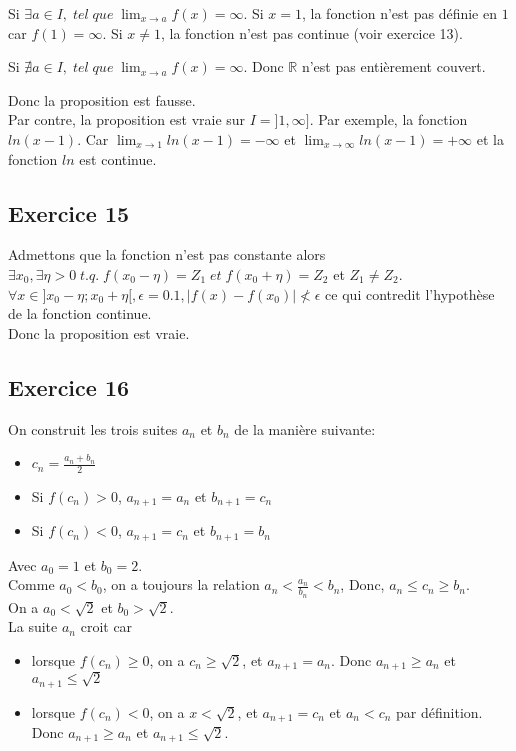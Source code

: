 \documentclass[]{book}
\theoremstyle{definition}
\newcommand{\bb}[1]{\mathbb{#1}}
\newcommand{\R}{\bb{R}}
\begin{document}
Si $\exists a \in I, \; tel\; que\; \lim_{x \to a} f(x) = \infty$. Si $x = 1$, la fonction n'est pas d\'efinie en $1$ car $f(1) = \infty$. Si $x \neq 1$, la fonction n'est pas continue (voir exercice 13).

Si $\nexists a \in I, \; tel\; que\; \lim_{x \to a} f(x) = \infty$. Donc $\R$ n'est pas enti\`erement couvert.

Donc la proposition est fausse.
\\

Par contre, la proposition est vraie sur $I = ]1,\infty]$. Par exemple, la fonction $ln(x-1)$. Car $\lim_{x \to 1} ln(x-1) = -\infty$ et $\lim_{x \to \infty} ln(x-1) = +\infty$ et la fonction $ln$ est continue.



\subsection*{Exercice 15}
Admettons que la fonction n'est pas constante alors $\exists x_0, \exists \eta > 0\; t.q.\; f(x_0 - \eta) = Z_1\; et \; f(x_0 + \eta) = Z_2$ et $Z_1 \neq Z_2$.\\


$\forall x \in ]x_0 - \eta;x_0 + \eta[, \epsilon = 0.1, |f(x) - f(x_0)| \nless \epsilon$ ce qui contredit l'hypoth\`ese de la fonction continue.\\

Donc la proposition est vraie.

\subsection*{Exercice 16}
On construit les trois suites $a_n$ et $b_n$ de la mani\`ere suivante:
\begin{itemize}
\item $c_n = \frac{a_n + b_n}{2}$
\item Si $f(c_n) > 0$, $a_{n+1} = a_n$ et $b_{n+1} = c_n$
\item Si $f(c_n) < 0$, $a_{n+1} = c_n$ et $b_{n+1} = b_n$
\end{itemize}
Avec $a_0 = 1$ et $b_0 = 2$.\\

Comme $a_0 < b_0$, on a toujours la relation $a_n < \frac{a_n}{b_n} < b_n$, Donc, $a_n \le c_n \ge b_n$.\\
On a $a_0 < \sqrt{2}$ et $b_0 > \sqrt{2}$.\\
 
La suite $a_n$ croit car 
\begin{itemize}
\item lorsque $f(c_n) \ge 0$, on a $c_n \ge \sqrt{2}$, et $a_{n+1} = a_n$. Donc $a_{n+1} \ge a_{n}$ et $a_{n+1} \le \sqrt{2}$
\item lorsque $f(c_n) < 0$, on a $x < \sqrt{2}$, et $a_{n+1} = c_n$ et $a_n < c_n$ par d\'efinition. Donc $a_{n+1} \ge a_{n}$ et $a_{n+1} \le \sqrt{2}$.   
\end{itemize}
\end{document}
